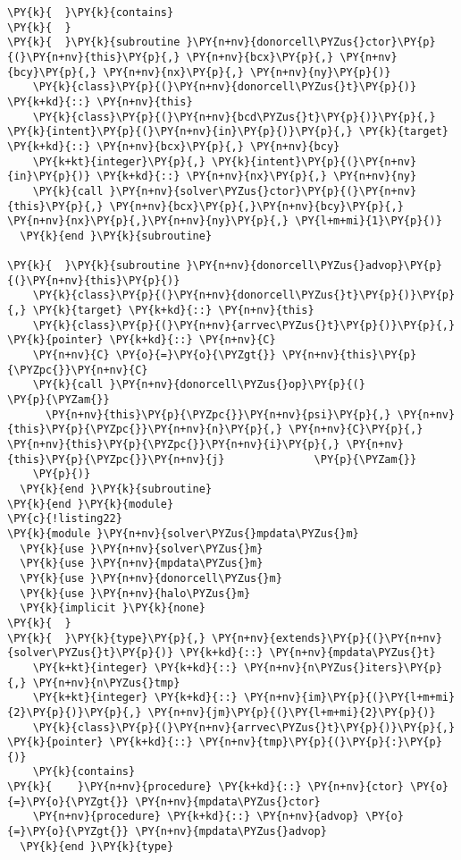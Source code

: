 \begin{Verbatim}[commandchars=\\\{\}]
\PY{k}{  }\PY{k}{contains}
\PY{k}{  }
\PY{k}{  }\PY{k}{subroutine }\PY{n+nv}{donorcell\PYZus{}ctor}\PY{p}{(}\PY{n+nv}{this}\PY{p}{,} \PY{n+nv}{bcx}\PY{p}{,} \PY{n+nv}{bcy}\PY{p}{,} \PY{n+nv}{nx}\PY{p}{,} \PY{n+nv}{ny}\PY{p}{)}
    \PY{k}{class}\PY{p}{(}\PY{n+nv}{donorcell\PYZus{}t}\PY{p}{)} \PY{k+kd}{::} \PY{n+nv}{this}
    \PY{k}{class}\PY{p}{(}\PY{n+nv}{bcd\PYZus{}t}\PY{p}{)}\PY{p}{,} \PY{k}{intent}\PY{p}{(}\PY{n+nv}{in}\PY{p}{)}\PY{p}{,} \PY{k}{target} \PY{k+kd}{::} \PY{n+nv}{bcx}\PY{p}{,} \PY{n+nv}{bcy}
    \PY{k+kt}{integer}\PY{p}{,} \PY{k}{intent}\PY{p}{(}\PY{n+nv}{in}\PY{p}{)} \PY{k+kd}{::} \PY{n+nv}{nx}\PY{p}{,} \PY{n+nv}{ny}
    \PY{k}{call }\PY{n+nv}{solver\PYZus{}ctor}\PY{p}{(}\PY{n+nv}{this}\PY{p}{,} \PY{n+nv}{bcx}\PY{p}{,}\PY{n+nv}{bcy}\PY{p}{,} \PY{n+nv}{nx}\PY{p}{,}\PY{n+nv}{ny}\PY{p}{,} \PY{l+m+mi}{1}\PY{p}{)}
  \PY{k}{end }\PY{k}{subroutine}

\PY{k}{  }\PY{k}{subroutine }\PY{n+nv}{donorcell\PYZus{}advop}\PY{p}{(}\PY{n+nv}{this}\PY{p}{)}
    \PY{k}{class}\PY{p}{(}\PY{n+nv}{donorcell\PYZus{}t}\PY{p}{)}\PY{p}{,} \PY{k}{target} \PY{k+kd}{::} \PY{n+nv}{this}
    \PY{k}{class}\PY{p}{(}\PY{n+nv}{arrvec\PYZus{}t}\PY{p}{)}\PY{p}{,} \PY{k}{pointer} \PY{k+kd}{::} \PY{n+nv}{C}
    \PY{n+nv}{C} \PY{o}{=}\PY{o}{\PYZgt{}} \PY{n+nv}{this}\PY{p}{\PYZpc{}}\PY{n+nv}{C}
    \PY{k}{call }\PY{n+nv}{donorcell\PYZus{}op}\PY{p}{(}                                 \PY{p}{\PYZam{}}
      \PY{n+nv}{this}\PY{p}{\PYZpc{}}\PY{n+nv}{psi}\PY{p}{,} \PY{n+nv}{this}\PY{p}{\PYZpc{}}\PY{n+nv}{n}\PY{p}{,} \PY{n+nv}{C}\PY{p}{,} \PY{n+nv}{this}\PY{p}{\PYZpc{}}\PY{n+nv}{i}\PY{p}{,} \PY{n+nv}{this}\PY{p}{\PYZpc{}}\PY{n+nv}{j}              \PY{p}{\PYZam{}}
    \PY{p}{)}
  \PY{k}{end }\PY{k}{subroutine}
\PY{k}{end }\PY{k}{module}
\PY{c}{!listing22}
\PY{k}{module }\PY{n+nv}{solver\PYZus{}mpdata\PYZus{}m}
  \PY{k}{use }\PY{n+nv}{solver\PYZus{}m}
  \PY{k}{use }\PY{n+nv}{mpdata\PYZus{}m}
  \PY{k}{use }\PY{n+nv}{donorcell\PYZus{}m}
  \PY{k}{use }\PY{n+nv}{halo\PYZus{}m}
  \PY{k}{implicit }\PY{k}{none}
\PY{k}{  }
\PY{k}{  }\PY{k}{type}\PY{p}{,} \PY{n+nv}{extends}\PY{p}{(}\PY{n+nv}{solver\PYZus{}t}\PY{p}{)} \PY{k+kd}{::} \PY{n+nv}{mpdata\PYZus{}t}
    \PY{k+kt}{integer} \PY{k+kd}{::} \PY{n+nv}{n\PYZus{}iters}\PY{p}{,} \PY{n+nv}{n\PYZus{}tmp}
    \PY{k+kt}{integer} \PY{k+kd}{::} \PY{n+nv}{im}\PY{p}{(}\PY{l+m+mi}{2}\PY{p}{)}\PY{p}{,} \PY{n+nv}{jm}\PY{p}{(}\PY{l+m+mi}{2}\PY{p}{)}
    \PY{k}{class}\PY{p}{(}\PY{n+nv}{arrvec\PYZus{}t}\PY{p}{)}\PY{p}{,} \PY{k}{pointer} \PY{k+kd}{::} \PY{n+nv}{tmp}\PY{p}{(}\PY{p}{:}\PY{p}{)} 
    \PY{k}{contains}
\PY{k}{    }\PY{n+nv}{procedure} \PY{k+kd}{::} \PY{n+nv}{ctor} \PY{o}{=}\PY{o}{\PYZgt{}} \PY{n+nv}{mpdata\PYZus{}ctor}
    \PY{n+nv}{procedure} \PY{k+kd}{::} \PY{n+nv}{advop} \PY{o}{=}\PY{o}{\PYZgt{}} \PY{n+nv}{mpdata\PYZus{}advop}
  \PY{k}{end }\PY{k}{type}


\end{Verbatim}
